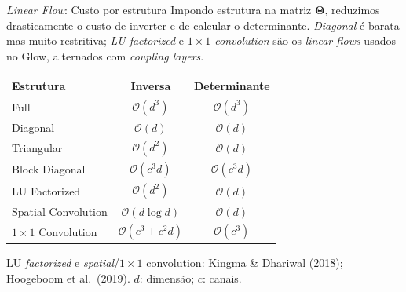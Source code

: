 \documentclass[aspectratio=169,xcolor=dvipsnames]{beamer}
\begin{document}
  \begin{frame}{\textit{Linear Flow}: Custo por estrutura}
    Impondo estrutura na matriz $\mathbf{\Theta}$, reduzimos drasticamente o custo
    de inverter e de calcular o determinante. \emph{Diagonal} é barata mas muito
    restritiva; \textcolor{EncRed}{\emph{LU factorized}} e
    \textcolor{EncRed}{\emph{$1{\times}1$ convolution}} são os \textit{linear
    flows} usados no Glow, alternados com \textit{coupling layers}.
    \vspace{0.4em}
    \begin{center}
      \footnotesize
      \renewcommand{\arraystretch}{1.25}
      \begin{tabular}{lcc}
        \toprule
        \textbf{Estrutura} & \textbf{Inversa} & \textbf{Determinante} \\
        \midrule
        Full           & $\mathcal{O}(d^{3})$   & $\mathcal{O}(d^{3})$   \\
        Diagonal       & $\mathcal{O}(d)$       & $\mathcal{O}(d)$       \\
        Triangular     & $\mathcal{O}(d^{2})$   & $\mathcal{O}(d)$       \\
        Block Diagonal & $\mathcal{O}(c^{3} d)$ & $\mathcal{O}(c^{3} d)$ \\
        \textcolor{EncRed}{LU Factorized}
                       & \textcolor{EncRed}{$\mathcal{O}(d^{2})$}
                       & \textcolor{EncRed}{$\mathcal{O}(d)$}           \\
        Spatial Convolution & $\mathcal{O}(d \log d)$ & $\mathcal{O}(d)$ \\
        \textcolor{EncRed}{$1{\times}1$ Convolution}
                       & \textcolor{EncRed}{$\mathcal{O}(c^{3} + c^{2} d)$}
                       & \textcolor{EncRed}{$\mathcal{O}(c^{3})$}       \\
        \bottomrule
      \end{tabular}
    \end{center}
    \vspace{0.1em}
    \tiny LU \textit{factorized} e \textit{spatial}/$1{\times}1$ convolution:
    Kingma \& Dhariwal (2018); Hoogeboom et al.\ (2019). $d$: dimensão;
    $c$: canais.\par
  \end{frame}

\end{document}
